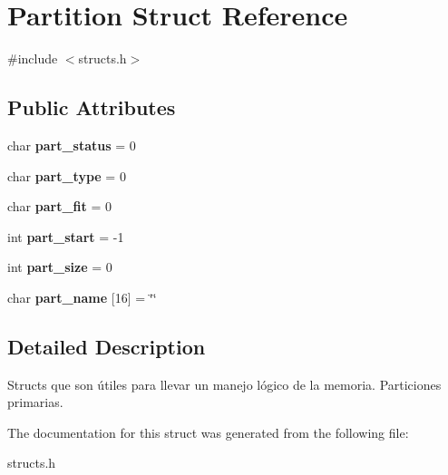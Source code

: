 \hypertarget{structPartition}{}\section{Partition Struct Reference}
\label{structPartition}


{\ttfamily \#include $<$structs.\+h$>$}

\subsection*{Public Attributes}
\begin{DoxyCompactItemize}
\item 
\mbox{\label{structPartition_a2d12cff678829bd670c6ae3a49ed04a6}} 
char {\bfseries part\+\_\+status} = \textquotesingle{}0\textquotesingle{}
\item 
\mbox{\label{structPartition_afe3fef54e52e839f3f153c6d2a4f932e}} 
char {\bfseries part\+\_\+type} = \textquotesingle{}0\textquotesingle{}
\item 
\mbox{\label{structPartition_a6232bfa1f2f926b88ae704562283fc98}} 
char {\bfseries part\+\_\+fit} = \textquotesingle{}0\textquotesingle{}
\item 
\mbox{\label{structPartition_a81300df85aef6c01b6d87938da973030}} 
int {\bfseries part\+\_\+start} = -\/1
\item 
\mbox{\label{structPartition_a76ba8d57b0c043332e156bd1c57b774c}} 
int {\bfseries part\+\_\+size} = 0
\item 
\mbox{\label{structPartition_a737c9efae493f96a75693b6417dec937}} 
char {\bfseries part\+\_\+name} \mbox{[}16\mbox{]} = \char`\"{}\char`\"{}
\end{DoxyCompactItemize}


\subsection{Detailed Description}
Structs que son útiles para llevar un manejo lógico de la memoria. Particiones primarias. 

The documentation for this struct was generated from the following file\+:\begin{DoxyCompactItemize}
\item 
structs.\+h\end{DoxyCompactItemize}
